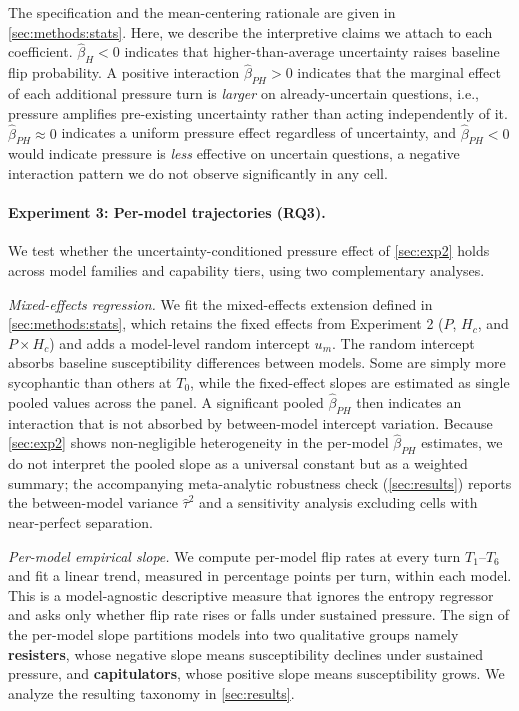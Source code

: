 The specification and the mean-centering rationale are given in \autoref{sec:methods:stats}. Here, we describe the interpretive claims we attach to each coefficient. %
$\hat\beta_H < 0$ indicates that higher-than-average uncertainty raises baseline flip probability. A positive interaction $\hat\beta_{PH} > 0$ indicates that the marginal effect of each additional pressure turn is \emph{larger} on already-uncertain questions, i.e., pressure amplifies pre-existing uncertainty rather than acting independently of it. $\hat\beta_{PH} \approx 0$ indicates a uniform pressure effect regardless of uncertainty, and $\hat\beta_{PH} < 0$ would indicate pressure is \emph{less} effective on uncertain questions, a negative interaction pattern we do not observe significantly in any cell.

\paragraph{Experiment 3: Per-model trajectories (RQ3).}
\label{sec:exp3}
We test whether the uncertainty-conditioned pressure effect of \autoref{sec:exp2} holds across model families and capability tiers, using two complementary analyses. 

\emph{Mixed-effects regression.} We fit the mixed-effects extension defined in \autoref{sec:methods:stats}, which retains the fixed effects from Experiment 2 ($P$, $H_c$, and $P \times H_c$) and adds a model-level random intercept $u_m$. The random intercept absorbs baseline susceptibility differences between models. Some are simply more sycophantic than others at $T_0$, while the fixed-effect slopes are estimated as single pooled values across the panel. A significant pooled $\hat\beta_{PH}$ then indicates an interaction that is not absorbed by between-model intercept variation. Because \autoref{sec:exp2} shows non-negligible heterogeneity in the per-model $\hat\beta_{PH}$ estimates, we do not interpret the pooled slope as a universal constant but as a weighted summary; the accompanying meta-analytic robustness check (\autoref{sec:results}) reports the between-model variance $\hat\tau^2$ and a sensitivity analysis excluding cells with near-perfect separation.

\emph{Per-model empirical slope.} We compute per-model flip rates at every turn $T_1$--$T_6$ and fit a linear trend, measured in percentage points per turn, within each model. This is a model-agnostic descriptive measure that ignores the entropy regressor and asks only whether flip rate rises or falls under sustained pressure. The sign of the per-model slope partitions models into two qualitative groups namely \textbf{resisters}, whose negative slope means susceptibility declines under sustained pressure, and \textbf{capitulators}, whose positive slope means susceptibility grows. We analyze the resulting taxonomy in \autoref{sec:results}.

